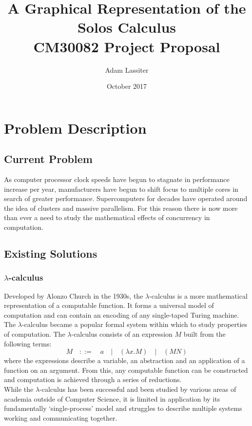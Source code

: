 \documentclass{article}
\title{A Graphical Representation of the Solos Calculus \\
	\large CM30082 Project Proposal}
\author{Adam Lassiter}
\date{October 2017}
\begin{document}
\maketitle

\vfill

\tableofcontents

\pagebreak


\section{Problem Description}
\subsection{Current Problem}
As computer processor clock speeds have begun to stagnate in performance increase per year, manufacturers have begun to shift focus to multiple cores in search of greater performance. Supercomputers for decades have operated around the idea of clusters and massive parallelism. For this reason there is now more than ever a need to study the mathematical effects of concurrency in computation.

\subsection{Existing Solutions}
\subsubsection{$\lambda$-calculus}\label{ssubsec:solns_lambda_calc}
Developed by Alonzo Church in the 1930s, the $\lambda$-calculus is a more mathematical representation of a computable function. It forms a universal model of computation and can contain an encoding of any single-taped Turing machine. The $\lambda$-calculus became a popular formal system within which to study properties of computation.
The $\lambda$-calculus consists of an expression $M$ built from the following terms:
\begin{equation*}
	M  \quad::=\quad  a  \quad|\quad  (\lambda x . M)  \quad|\quad  (M N)
\end{equation*}
where the expressions describe a variable, an abstraction and an application of a function on an argument. From this, any computable function can be constructed and computation is achieved through a series of reductions.
\\
While the $\lambda$-calculus has been successful and been studied by various areas of academia outside of Computer Science, it is limited in application by its fundamentally `single-process' model and struggles to describe multiple systems working and communicating together.
\end{document}
